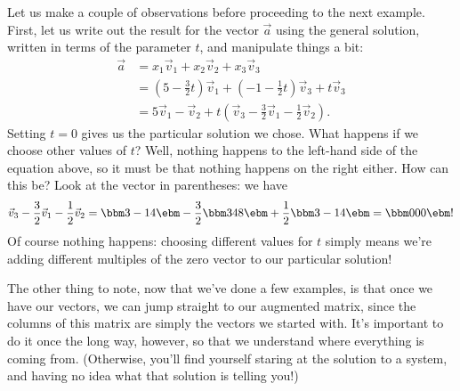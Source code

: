 Let us make a couple of observations before proceeding to the next example. First, let us write out the result for the vector $\vec{a}$ using the general solution, written in terms of the parameter $t$, and manipulate things a bit:
\begin{align*}
\vec{a} & = x_1\vec{v}_1+x_2\vec{v}_2+x_3\vec{v}_3\\
 & = \left(5-\frac32 t\right)\vec{v}_1 + \left(-1-\frac12 t\right)\vec{v}_3 + t\vec{v}_3\\
 & = 5\vec{v}_1-\vec{v}_2 + t\left(\vec{v}_3 - \frac{3}{2}\vec{v}_1 - \frac{1}{2}\vec{v}_2\right).
\end{align*}
Setting $t=0$ gives us the particular solution we chose. What happens if we choose other values of $t$? Well, nothing happens to the left-hand side of the equation above, so it must be that nothing happens on the right either. How can this be? Look at the vector in parentheses: we have
\[
\vec{v}_3-\frac{3}{2}\vec{v}_1-\frac{1}{2}\vec{v}_2 = \bbm 3\\-1\\4\ebm -\frac{3}{2}\bbm 3\\4\\8\ebm +\frac{1}{2}\bbm 3\\-1\\4\ebm = \bbm 0\\ 0\\0\ebm!
\]
Of course nothing happens: choosing different values for $t$ simply means we're adding different multiples of the zero vector to our particular solution! 


The other thing to note, now that we've done a few examples, is that once we have our vectors, we can jump straight to our augmented matrix, since the columns of this matrix are simply the vectors we started with. It's important to do it once the long way, however, so that we understand where everything is coming from. (Otherwise, you'll find yourself staring at the solution to a system, and having no idea what that solution is telling you!)

